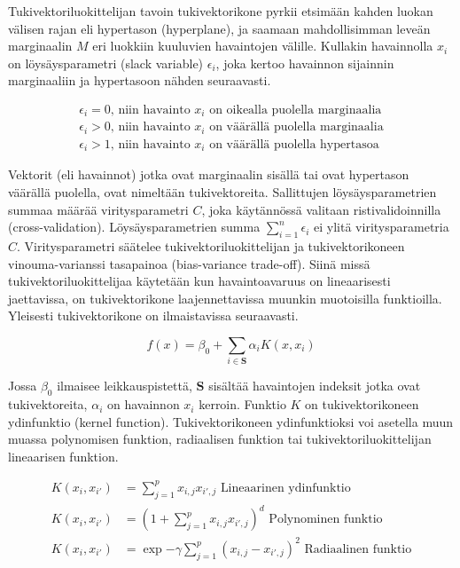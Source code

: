 \documentclass[finnish,twoside,openright]{HYgraduMLDS}
\begin{document}
Tukivektoriluokittelijan tavoin tukivektorikone pyrkii etsimään kahden luokan välisen rajan eli hypertason (hyperplane), ja saamaan mahdollisimman leveän marginaalin $M$ eri luokkiin kuuluvien havaintojen välille. Kullakin havainnolla $x_i$ on löysäysparametri (slack variable) $\epsilon_i$, joka kertoo havainnon sijainnin marginaaliin ja hypertasoon nähden seuraavasti. 

\begin{gather}
    \epsilon_i = 0\text{, niin havainto $x_i$ on oikealla puolella marginaalia}\\
    \epsilon_i > 0\text{, niin havainto $x_i$ on väärällä puolella marginaalia}\\
    \epsilon_i > 1\text{, niin havainto $x_i$ on väärällä puolella hypertasoa}
\end{gather}

Vektorit (eli havainnot) jotka ovat marginaalin sisällä tai ovat hypertason väärällä puolella, ovat nimeltään tukivektoreita. Sallittujen löysäysparametrien summaa määrää viritysparametri $C$, joka käytännössä valitaan ristivalidoinnilla (cross-validation). Löysäysparametrien summa $\sum^n_{i=1} \epsilon_i$ ei ylitä viritysparametria $C$. Viritysparametri säätelee tukivektoriluokittelijan ja tukivektorikoneen vinouma-varianssi tasapainoa (bias-variance trade-off). Siinä missä tukivektoriluokittelijaa käytetään kun havaintoavaruus on lineaarisesti jaettavissa, on tukivektorikone laajennettavissa muunkin muotoisilla funktioilla. Yleisesti tukivektorikone on ilmaistavissa seuraavasti.

\begin{equation}
    f(x) = \beta_0 + \sum_{i \in \textbf{S}} \alpha_i K(x, x_i)
\end{equation}

Jossa $\beta_0$ ilmaisee leikkauspistettä, $\textbf{S}$ sisältää havaintojen indeksit jotka ovat tukivektoreita, $\alpha_i$ on havainnon $x_i$ kerroin. Funktio $K$ on tukivektorikoneen ydinfunktio (kernel function). Tukivektorikoneen ydinfunktioksi voi asetella muun muassa polynomisen funktion, radiaalisen funktion tai tukivektoriluokittelijan lineaarisen funktion.

\begin{align}
    K(x_i, x_{i'}) &= \sum^p_{j=1} x_{i, j} x_{i', j} \text{ Lineaarinen ydinfunktio}\\
    K(x_i, x_{i'}) &= (1 + \sum^p_{j=1} x_{i, j} x_{i', j} )^d \text{ Polynominen funktio}\\
    K(x_i, x_{i'}) &= \exp{-\gamma \sum^p_{j=1}( x_{i, j} - x_{i', j} )^2} \text{ Radiaalinen funktio}
\end{align}
\end{document}
